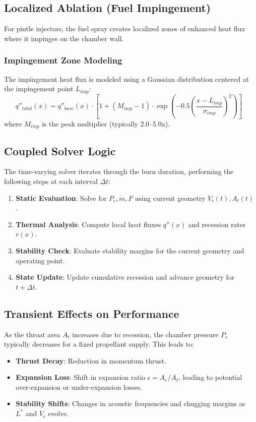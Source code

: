 \subsection{Localized Ablation (Fuel Impingement)}
For pintle injectors, the fuel spray creates localized zones of enhanced heat flux where it impinges on the chamber wall.

\subsubsection{Impingement Zone Modeling}
The impingement heat flux is modeled using a Gaussian distribution centered at the impingement point \(L_{imp}\):
\begin{equation}
q''_{total}(x) = q''_{base}(x) \cdot \left[1 + (M_{imp} - 1) \cdot \exp\left(-0.5 \left(\frac{x - L_{imp}}{\sigma_{imp}}\right)^2\right)\right]
\end{equation}
where \(M_{imp}\) is the peak multiplier (typically 2.0--5.0x).

\subsection{Coupled Solver Logic}
The time-varying solver iterates through the burn duration, performing the following steps at each interval \(\Delta t\):
\begin{enumerate}
    \item \textbf{Static Evaluation}: Solve for \(P_c, \dot{m}, F\) using current geometry \(V_c(t), A_t(t)\).
    \item \textbf{Thermal Analysis}: Compute local heat fluxes \(q''(x)\) and recession rates \(\dot{r}(x)\).
    \item \textbf{Stability Check}: Evaluate stability margins for the current geometry and operating point.
    \item \textbf{State Update}: Update cumulative recession and advance geometry for \(t + \Delta t\).
\end{enumerate}

\subsection{Transient Effects on Performance}
As the throat area \(A_t\) increases due to recession, the chamber pressure \(P_c\) typically decreases for a fixed propellant supply. This leads to:
\begin{itemize}
    \item \textbf{Thrust Decay}: Reduction in momentum thrust.
    \item \textbf{Expansion Loss}: Shift in expansion ratio \(\epsilon = A_e/A_t\), leading to potential over-expansion or under-expansion losses.
    \item \textbf{Stability Shifts}: Changes in acoustic frequencies and chugging margins as \(L^*\) and \(V_c\) evolve.
\end{itemize}

